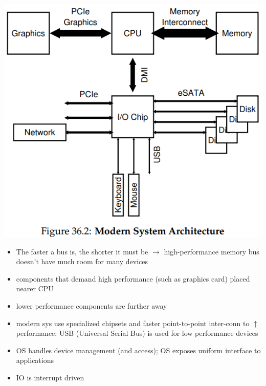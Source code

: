 \documentclass[8pt,a4paper,landscape]{extarticle}
\begin{document}
\begin{multicols*}{3}
\begin{minipage}{.5\linewidth}
\includegraphics[width=\linewidth]{imgs/modern_sys_arch}
\end{minipage}
\begin{minipage}{.5\linewidth}
  \flushleft
  \begin{itemize}
  \item The faster a bus is, the shorter it must be $\to$ high-performance memory bus doesn't have much room for many devices
  \item components that demand high performance (such as graphics card) placed nearer CPU
  \item lower performance components are further away
  \end{itemize}
\end{minipage}
\begin{minipage}{.5\linewidth}
  \flushleft
  \begin{itemize}
  \item modern sys use specialized chipsets and faster point-to-point inter-conn to $\uparrow$ performance; USB (Universal Serial Bus) is used for low performance devices
  \item OS handles device management (and access); OS exposes uniform interface to applications
  \item IO is interrupt driven
  \end{itemize}
\end{minipage}
\begin{minipage}{.65\linewidth}

\end{minipage}
\end{multicols*}
\end{document}
